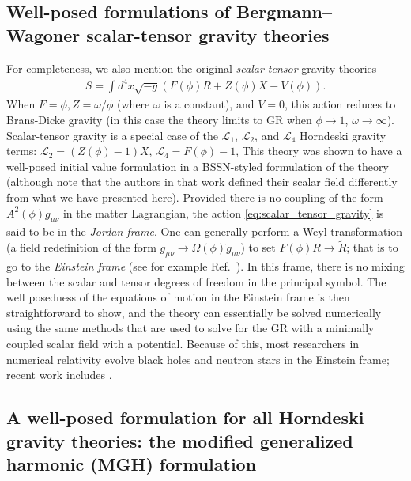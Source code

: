\documentclass{ws-ijmpd}
\begin{document}
\subsection{Well-posed formulations of
Bergmann--Wagoner scalar-tensor gravity theories 
\label{sec:scalar_tensor_special_case}
}
For completeness, we also mention the original
\emph{scalar-tensor} gravity 
theories\cite{Wagoner:1970vr,nordtvedt1970post,will_2018,Quiros:2019ktw}
\begin{align}
   \label{eq:scalar_tensor_gravity}
   S
   =
   \int d^4x\sqrt{-g}\left(
      F\left(\phi\right) R
      +
      Z\left(\phi\right)X
      -
      V\left(\phi\right)
   \right)
   .
\end{align}
When $F=\phi,Z=\omega/\phi$ (where $\omega$ is a constant),
and $V=0$, this action reduces to
Brans-Dicke gravity\cite{Brans:1961sx}
(in this case the theory limits to GR when $\phi\to1$, $\omega\to\infty$).
Scalar-tensor gravity is a special case of the
$\mathcal{L}_1$, $\mathcal{L}_2$, 
and $\mathcal{L}_4$ Horndeski gravity terms:
$\mathcal{L}_2=\left(Z\left(\phi\right) -1\right)X$,
$\mathcal{L}_4=F\left(\phi\right)-1$,
This theory was shown to have a well-posed initial value formulation
in a BSSN-styled formulation of the theory\cite{Salgado:2008xh}
(although note that the authors in that work defined their
scalar field differently from what we have presented here).
Provided there is no coupling of the form $A^2\left(\phi\right)g_{\mu\nu}$
in the matter Lagrangian, the action \eqref{eq:scalar_tensor_gravity}
is said to be in the \emph{Jordan frame}.
One can generally perform a Weyl transformation
(a field redefinition of the form
$g_{\mu\nu}\to \Omega\left(\phi\right)\tilde{g}_{\mu\nu}$) to set
$F\left(\phi\right)R\to \tilde{R}$; that is to go to the
\emph{Einstein frame} (see for example Ref.~). 
In this frame, there is no mixing
between the scalar and tensor degrees of freedom in the
principal symbol.
The well posedness of the equations of motion in the Einstein
frame is then straightforward
to show, and the theory can essentially be 
solved numerically using the same methods that are used
to solve for the GR with a minimally coupled
scalar field with a potential. 
Because of this, most researchers
in numerical relativity evolve black holes and neutron
stars in the Einstein frame; recent work includes 
.

\subsection{A well-posed formulation for all Horndeski gravity
theories: the modified generalized harmonic (MGH) formulation
\label{sec:mgh_formulation}
}
\end{document}
